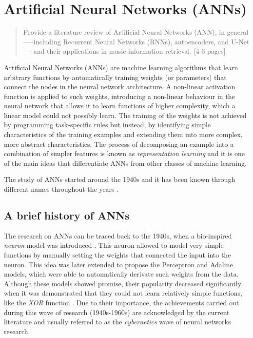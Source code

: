 \chapter{Artificial Neural Networks (ANNs)}
\label{chap:chap2}

\begin{quote}
    Provide a literature review of Artificial Neural Networks (ANN), in general—--including Recurrent Neural Networks (RNNs), autoencoders, and U-Net—--and their applications in music information retrieval. [4-6 pages]
\end{quote}
\clearpage

Artificial Neural Networks (ANNs) are machine learning algorithms that learn arbitrary functions by automatically training weights (or parameters) that connect the nodes in the neural network architecture. A non-linear activation function is applied to such weights, introducing a non-linear behaviour in the neural network that allows it to learn functions of higher complexity, which a linear model could not possibly learn. The training of the weights is not achieved by programming task-specific rules but instead, by identifying simple characteristics of the training examples and extending them into more complex, more abstract characteristics. The process of decomposing an example into a combination of simpler features is known as \emph{representation learning} and it is one of the main ideas that differentiate ANNs from other classes of machine learning. 

The study of ANNs started around the 1940s and it has been known through different names throughout the years \cite{goodfellow_deep_2016}.

\section{A brief history of ANNs}

The research on ANNs can be traced back to the 1940s, when a bio-inspired \emph{neuron} model was introduced \cite{mcculloch_logical_1943}. This neuron allowed to model very simple functions by manually setting the weights that connected the input into the neuron. This idea was later extended to propose the Perceptron \cite{rosenblatt_perceptron:_1958} and Adaline \cite{widrow_adaptive_1960} models, which were able to automatically derivate such weights from the data. Although these models showed promise, their popularity decreased significantly when it was demonstrated that they could not learn relatively simple functions, like the \emph{XOR} function \cite{minsky_perceptrons:_1972}. Due to their importance, the achievements carried out during this wave of research (1940s-1960s) are acknowledged by the current literature \cite{goodfellow_deep_2016} and usually referred to as the \emph{cybernetics} wave of neural networks research.

